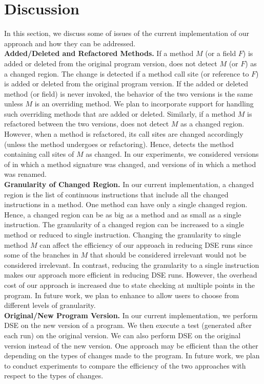 
\section{Discussion}

\label{sec:discussion}
In this section, we discuss some of issues of the current implementation of our approach and
how they can be addressed.
\\ \textbf{Added/Deleted and Refactored Methods.} If a method $M$ (or a field $F$) is added or deleted from the original program version,  does not detect $M$ (or $F$) as a changed region. The change is detected if a method call site (or reference to $F$) is added or deleted from the original program version. If the added or deleted method (or field) is never invoked, the behavior of the two versions is the same unless $M$  is an overriding method. We plan to incorporate support for handling such overriding methods that are added or deleted. Similarly, if a method $M$ is refactored between the two versions,  does not detect $M$ as a changed region. However, when a method is refactored, its call sites are changed accordingly (unless the method undergoes  or  refactoring). Hence,  detects the method containing call sites of $M$ as changed. In our experiments, we considered versions of  in which a method signature was changed, and versions of  in which a method was renamed.
\\ \textbf{Granularity of Changed Region.} In our current implementation, a changed region is the list of continuous instructions that include all the changed instructions in a method. One method can have only a single changed region. Hence, a changed region can be as big as a method and as small as a single instruction. The granularity of a changed region can be increased to a single method or reduced to single instruction. Changing the granularity to single method $M$ can affect the efficiency of our approach in reducing DSE runs since some of the branches in $M$ that should be considered irrelevant would not be considered irrelevant. In contrast, reducing the granularity to a single instruction makes our approach more efficient in reducing DSE runs. However, the overhead cost of our approach is increased due to state checking at multiple points in the program. In future work, we plan to enhance  to allow users to choose from different levels of granularity. 
\\ \textbf{Original/New Program Version.} In our current implementation, we perform DSE on the new version of a program. We then execute a test (generated after each run) on the original version. We can also perform DSE on the original version instead of the new version. One approach may be efficient than the other depending on the types of changes made to the program. In future work, we plan to conduct experiments to compare the efficiency of the two approaches with respect to the types of changes. 

